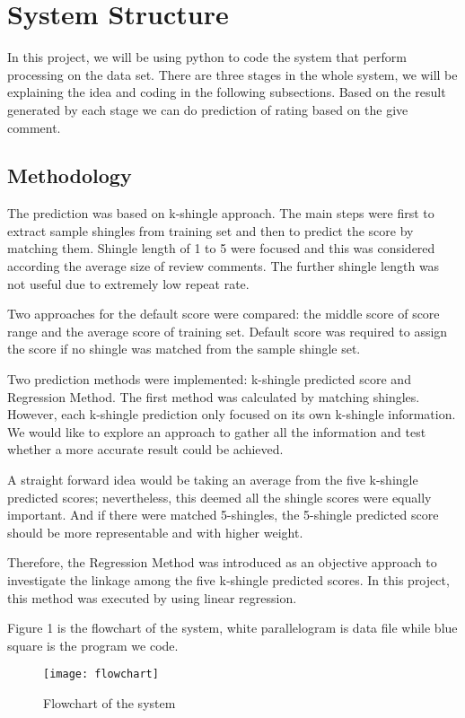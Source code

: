 \section{System Structure}
In this project, we will be using python to code the system that perform processing on the data set. There are three stages in the whole system, we will be explaining the idea and coding in the following subsections. Based on the result generated by each stage we can do prediction of rating based on the give comment.

\subsection{Methodology}
The prediction was based on k-shingle approach. The main steps were first to extract sample shingles from training set and then to predict the score by matching them. Shingle length of 1 to 5 were focused and this was considered according the average size of review comments. The further shingle length was not useful due to extremely low repeat rate.

Two approaches for the default score were compared: the middle score of score range and the average score of training set. Default score was required to assign the score if no shingle was matched from the sample shingle set.

Two prediction methods were implemented: k-shingle predicted score and Regression Method. The first method was calculated by matching shingles. However, each k-shingle prediction only focused on its own k-shingle information. We would like to explore an approach to gather all the information and test whether a more accurate result could be achieved.

A straight forward idea would be taking an average from the five k-shingle predicted scores; nevertheless, this deemed all the shingle scores were equally important. And if there were matched 5-shingles, the 5-shingle predicted score should be more representable and with higher weight.

Therefore, the Regression Method was introduced as an objective approach to investigate the linkage among the five k-shingle predicted scores. In this project, this method was executed by using linear regression.

Figure 1 is the flowchart of the system, white parallelogram is data file while blue square is the program we code.

\begin{figure}
\texttt{[image: flowchart]}
\caption{Flowchart of the system}
\end{figure}

